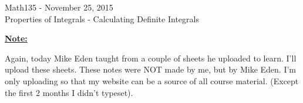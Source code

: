 \documentclass{letter}
\begin{document}
	\begin{center}
		\LARGE Math135 - November 25, 2015\\
		\large Properties of Integrals - Calculating Definite Integrals
	\end{center}
	\vspace{0.25 in}
	\underline{\textbf{Note:}}
	
	Again, today Mike Eden taught from a couple of sheets he uploaded to learn. I'll upload these sheets. These notes were NOT made by me, but by Mike Eden. I'm only uploading so that my website can be a source of all course material. (Except the first 2 months I didn't typeset).
\end{document}
